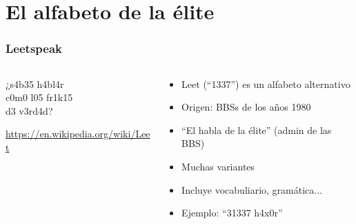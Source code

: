 %
%

\section{El alfabeto de la élite}

\begin{frame}
\frametitle{Leetspeak}

\begin{columns}[T]
\begin{column}{.48\textwidth}

  {\Huge
    ¿s4b35 h4bl4r \\
    c0m0 l05 fr1k15 \\
    d3 v3rd4d? \\
  }
  \vspace{1cm}
\begin{flushright}
  {
    \url{https://en.wikipedia.org/wiki/Leet}
  }
\end{flushright}

\end{column}%
\hfill%
\begin{column}{.50\textwidth}
{\Large
\begin{itemize}
\item Leet (``1337'') es un alfabeto alternativo
\item Origen: BBSs de los años 1980
\item ``El habla de la élite'' (admin de las BBS)
\item Muchas variantes
\item Incluye vocabuliario, gramática...
\item Ejemplo: ``31337 h4x0r''
\end{itemize}
}
\end{column}%
\end{columns}

\end{frame}

